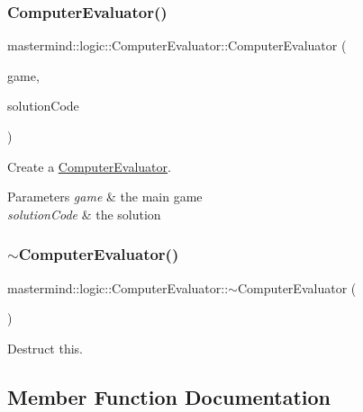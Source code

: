 \subsubsection{\texorpdfstring{Computer\+Evaluator()}{ComputerEvaluator()}}
{\footnotesize\ttfamily mastermind\+::logic\+::\+Computer\+Evaluator\+::\+Computer\+Evaluator (\begin{DoxyParamCaption}\item[{const \hyperlink{classmastermind_1_1logic_1_1_mastermind}{Mastermind} $\ast$}]{game,  }\item[{const \hyperlink{classmastermind_1_1logic_1_1_color_code}{Color\+Code} $\ast$}]{solution\+Code }\end{DoxyParamCaption})}



Create a \hyperlink{classmastermind_1_1logic_1_1_computer_evaluator}{Computer\+Evaluator}. 


\begin{DoxyParams}{Parameters}
{\em game} & the main game \\
\hline
{\em solution\+Code} & the solution \\
\hline
\end{DoxyParams}
\hypertarget{classmastermind_1_1logic_1_1_computer_evaluator_aa216efb1cb2e885562d01b76751c84be}{}\label{classmastermind_1_1logic_1_1_computer_evaluator_aa216efb1cb2e885562d01b76751c84be} 
\subsubsection{\texorpdfstring{$\sim$\+Computer\+Evaluator()}{~ComputerEvaluator()}}
{\footnotesize\ttfamily mastermind\+::logic\+::\+Computer\+Evaluator\+::$\sim$\+Computer\+Evaluator (\begin{DoxyParamCaption}{ }\end{DoxyParamCaption})}



Destruct this. 



\subsection{Member Function Documentation}
\hypertarget{classmastermind_1_1logic_1_1_computer_evaluator_a65f4a9bafcd5240e0cf92f6398025bd5}{}\label{classmastermind_1_1logic_1_1_computer_evaluator_a65f4a9bafcd5240e0cf92f6398025bd5} 
